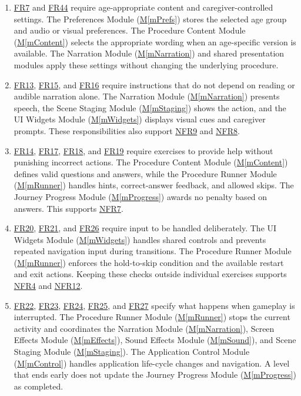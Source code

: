 \documentclass[10pt, titlepage]{article}
\newcommand{\srsurl}{https://team-hindsight.github.io/ophthamology-game/SRS/SRS.pdf}
\newcommand{\srsitemref}[2]{\href{\srsurl\#nameddest=#1}{#2}}
\newcommand{\mref}[1]{\texorpdfstring{\hyperref[md:#1]{M\ref*{#1}}}{M\ref*{#1}}}
\begin{document}
\begin{enumerate}[leftmargin=*, itemsep=0.5em, parsep=0.15em]
\item \srsitemref{FR_AgeGroup}{FR7} and \srsitemref{FR_Preferences}{FR44}
  require age-appropriate content and caregiver-controlled settings. The
  Preferences Module (\mref{mPrefs}) stores the selected age group and audio or
  visual preferences. The Procedure Content Module (\mref{mContent}) selects
  the appropriate wording when an age-specific version is available. The
  Narration Module (\mref{mNarration}) and shared presentation modules apply
  these settings without changing the underlying procedure.

\item \srsitemref{FR_SpokenInstructions}{FR13}, \srsitemref{FR_VisualCues}{FR15},
  and \srsitemref{FR_NarrationFallback}{FR16} require instructions that do not
  depend on reading or audible narration alone. The Narration Module
  (\mref{mNarration}) presents speech, the Scene Staging Module
  (\mref{mStaging}) shows the action, and the UI Widgets Module
  (\mref{mWidgets}) displays visual cues and caregiver prompts. These
  responsibilities also support \srsitemref{NFR_Accessibility}{NFR9} and
  \srsitemref{NFR_Language}{NFR8}.

\item \srsitemref{FR_HintOnMiss}{FR14}, \srsitemref{FR_RevealAnswer}{FR17},
  \srsitemref{FR_ValidQuestions}{FR18}, and \srsitemref{FR_NoPenalty}{FR19}
  require exercises to provide help without punishing incorrect actions. The
  Procedure Content Module (\mref{mContent}) defines valid questions and
  answers, while the Procedure Runner Module (\mref{mRunner}) handles hints,
  correct-answer feedback, and allowed skips. The Journey Progress Module
  (\mref{mProgress}) awards no penalty based on answers. This supports
  \srsitemref{NFR_NoPressure}{NFR7}.

\item \srsitemref{FR_IgnoreRepeatedTouches}{FR20},
  \srsitemref{FR_HoldSkip}{FR21}, and \srsitemref{FR_RestartLevel}{FR26}
  require input to be handled deliberately. The UI Widgets Module
  (\mref{mWidgets}) handles shared controls and prevents repeated navigation
  input during transitions. The Procedure Runner Module (\mref{mRunner})
  enforces the hold-to-skip condition and the available restart and exit
  actions. Keeping these checks outside individual exercises supports
  \srsitemref{NFR_Exit}{NFR4} and \srsitemref{NFR_Responsiveness}{NFR12}.

\item \srsitemref{FR_ExitLevel}{FR22}, \srsitemref{FR_StopOnExit}{FR23},
  \srsitemref{FR_ExitKeepsData}{FR24}, \srsitemref{FR_RestartAfterExit}{FR25},
  and \srsitemref{FR_Suspend}{FR27} specify what happens when gameplay is
  interrupted. The Procedure Runner Module (\mref{mRunner}) stops the current
  activity and coordinates the Narration Module (\mref{mNarration}), Screen
  Effects Module (\mref{mEffects}), Sound Effects Module (\mref{mSound}), and
  Scene Staging Module (\mref{mStaging}). The Application Control Module
  (\mref{mControl}) handles application life-cycle changes and navigation.
  A level that ends early does not update the Journey Progress Module
  (\mref{mProgress}) as completed.


\end{enumerate}
\end{document}
